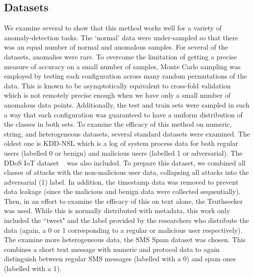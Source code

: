 \documentclass[conference]{IEEEtran}
\begin{document}
\label{methods}
\subsection{Datasets}
\label{datasets}
We examine several to show that this method works well for a variety of anomaly-detection tasks. The `normal' data were under-sampled so that there was an equal number of normal and anomalous samples. For several of the datasets, anomalies were rare. To overcome the limitation of getting a precise measure of accuracy on a small number of samples, Monte Carlo sampling was employed by testing each configuration across many random permutations of the data. This is known to be asymptotically equivalent to cross-fold validation~\cite{} which is not remotely precise enough when we have only a small number of anomalous data points. Additionally, the test and train sets were sampled in such a way that each configuration was guaranteed to have a uniform distribution of the classes in both sets. To examine the efficacy of this method on numeric, string, and heterogeneous datasets, several standard datasets were examined. The oldest one is KDD-NSL which is a log of system process data for both regular users (labelled 0 or benign) and malicious users (labelled 1 or adversarial). The DDoS IoT dataset ~\cite{} was also included. To prepare this dataset, we combined all classes of attacks with the non-malicious user data, collapsing all attacks into the adversarial (1) label. In addition, the timestamp data was removed to prevent data leakage  (since the malicious and benign data were collected sequentially). Then, in an effort to examine the efficacy of this on text alone, the Truthseeker ~\cite{} was used. While this is normally distributed with metadata, this work only included the ``tweet" and the label provided by the researchers who distribute the data (again, a 0 or 1 corresponding to a regular or malicious user respectively). The examine more heterogeneous data, the SMS Spam dataset was chosen. This combines a short text message with numeric and protocol data to again distinguish between regular SMS messages (labelled with a 0) and spam ones (labelled with a 1). 
\end{document}
